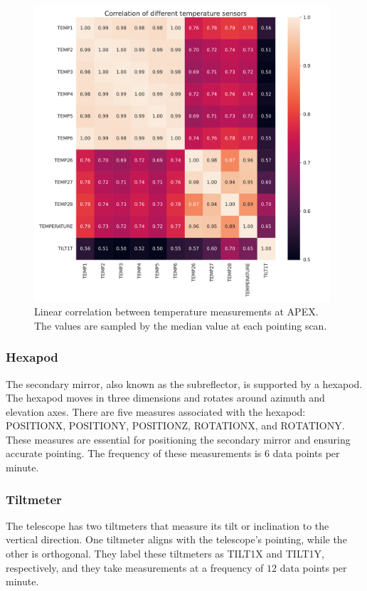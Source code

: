 \begin{figure}[H]
    \centering
    \includegraphics[width=0.98\textwidth]{Correlation/Correlation_temp.pdf}
    \caption[Correlation between temperature mesasurements]{Linear correlation between temperature measurements at APEX.
    The values are sampled by the median value at each pointing scan.}
    \label{fig:corr_temp}
\end{figure}

\subsubsection{Hexapod}
The secondary mirror, also known as the subreflector, is supported by a hexapod.
The hexapod moves in three dimensions and rotates around azimuth and elevation axes.
There are five measures associated with the hexapod: POSITIONX, POSITIONY, POSITIONZ, ROTATIONX, and ROTATIONY.
These measures are essential for positioning the secondary mirror and ensuring accurate pointing. The frequency of these measurements is $6$ data points per minute.

\subsubsection{Tiltmeter}
The telescope has two tiltmeters that measure its tilt or inclination to the vertical direction.
One tiltmeter aligns with the telescope's pointing, while the other is orthogonal.
They label these tiltmeters as TILT1X and TILT1Y, respectively, and they take measurements at a frequency of $12$ data points per minute.

